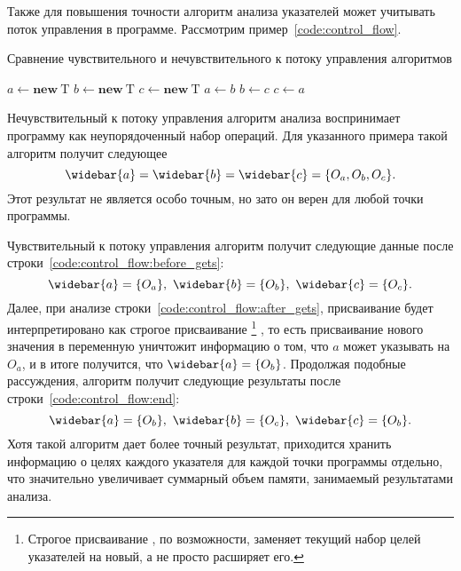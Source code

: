 \documentclass[14pt,titlepage,draft]{extarticle}
\newcommand{\type}[1]{\mathrm{#1}}
\newcommand{\op}[1]{\mathbf{#1}}
\newcommand{\pts}[1]{\widebar{#1}}
\begin{document}
        Также для повышения точности алгоритм анализа указателей может
        учитывать поток управления в программе.
        Рассмотрим пример~\ref{code:control_flow}.

        \begin{algorithm}
          \caption{Сравнение чувствительного и нечувствительного к потоку
                   управления алгоритмов}
          \label{code:control_flow}
          \begin{algorithmic}[1]
            \State $a \gets \op{new}~\type{T}$
            \State $b \gets \op{new}~\type{T}$
            \State $c \gets \op{new}~\type{T}$ \label{code:control_flow:before_gets}
            \State $a \gets b$ \label{code:control_flow:after_gets}
            \State $b \gets c$
            \State $c \gets a$ \label{code:control_flow:end}
          \end{algorithmic}
        \end{algorithm}

        Нечувствительный к потоку управления алгоритм анализа воспринимает
        программу как неупорядоченный набор операций.
        Для указанного примера такой алгоритм получит следующее
        \[\pts{a} = \pts{b} = \pts{c} = \{O_a, O_b, O_c\}.\]
        Этот результат не является особо точным, но зато он верен
        для любой точки программы.

        Чувствительный к потоку управления алгоритм получит следующие данные
        после строки~\ref{code:control_flow:before_gets}:
        \[\pts{a} = \{O_a\},\ \pts{b} = \{O_b\},\ \pts{c} = \{O_c\}.\]
        Далее, при анализе строки~\ref{code:control_flow:after_gets},
        присваивание будет интерпретировано как строгое присваивание%
        \footnote{Строгое присваивание , по возможности,
        заменяет текущий набор целей указателей на новый, а не просто расширяет
        его.}%
        , то есть присваивание нового значения в переменную уничтожит
        информацию о том, что $a$ может указывать на $O_a$, и в итоге
        получится, что $\pts{a} = \{O_b\}$.
        Продолжая подобные рассуждения, алгоритм получит следующие результаты
        после строки~\ref{code:control_flow:end}:
        \[\pts{a} = \{O_b\},\ \pts{b} = \{O_c\},\ \pts{c} = \{O_b\}.\]
        Хотя такой алгоритм дает более точный результат, приходится хранить
        информацию о целях каждого указателя для каждой точки программы
        отдельно, что значительно увеличивает суммарный объем памяти,
        занимаемый результатами анализа.
\end{document}
